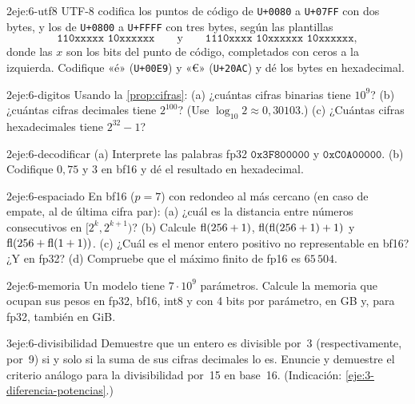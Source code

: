 \begin{ejercicio}{2}{eje:6-utf8}
UTF-8 codifica los puntos de código de \texttt{U+0080} a \texttt{U+07FF} con dos bytes, y los de \texttt{U+0800} a \texttt{U+FFFF} con tres bytes, según las plantillas
\[
\texttt{110xxxxx 10xxxxxx}\qquad\text{y}\qquad\texttt{1110xxxx 10xxxxxx 10xxxxxx},
\]
donde las $x$ son los bits del punto de código, completados con ceros a la izquierda. Codifique «é» (\texttt{U+00E9}) y «€» (\texttt{U+20AC}) y dé los bytes en hexadecimal.
\end{ejercicio}

\begin{ejercicio}{2}{eje:6-digitos}
Usando la \cref{prop:cifras}: (a) ¿cuántas cifras binarias tiene $10^9$? (b) ¿cuántas cifras decimales tiene $2^{100}$? (Use $\log_{10}2\approx0{,}30103$.) (c) ¿Cuántas cifras hexadecimales tiene $2^{32}-1$?
\end{ejercicio}

\begin{ejercicio}{2}{eje:6-decodificar}
(a) Interprete las palabras fp32 $\texttt{0x3F800000}$ y $\texttt{0xC0A00000}$. (b) Codifique $0{,}75$ y $3$ en bf16 y dé el resultado en hexadecimal.
\end{ejercicio}

\begin{ejercicio}{2}{eje:6-espaciado}
En bf16 ($p=7$) con redondeo al más cercano (en caso de empate, al de última cifra par): (a) ¿cuál es la distancia entre números consecutivos en $[2^k,2^{k+1})$? (b) Calcule $\operatorname{fl}(256+1)$, $\operatorname{fl}(\operatorname{fl}(256+1)+1)$ y $\operatorname{fl}(256+\operatorname{fl}(1+1))$. (c) ¿Cuál es el menor entero positivo no representable en bf16? ¿Y en fp32? (d) Compruebe que el máximo finito de fp16 es $65\,504$.
\end{ejercicio}

\begin{ejercicio}{2}{eje:6-memoria}
Un modelo tiene $7\cdot10^{9}$ parámetros. Calcule la memoria que ocupan sus pesos en fp32, bf16, int8 y con 4 bits por parámetro, en GB y, para fp32, también en GiB.
\end{ejercicio}

\begin{ejercicio}{3}{eje:6-divisibilidad}
Demuestre que un entero es divisible por~3 (respectivamente, por~9) si y solo si la suma de sus cifras decimales lo es. Enuncie y demuestre el criterio análogo para la divisibilidad por~15 en base~16. (Indicación: \cref{eje:3-diferencia-potencias}.)
\end{ejercicio}

